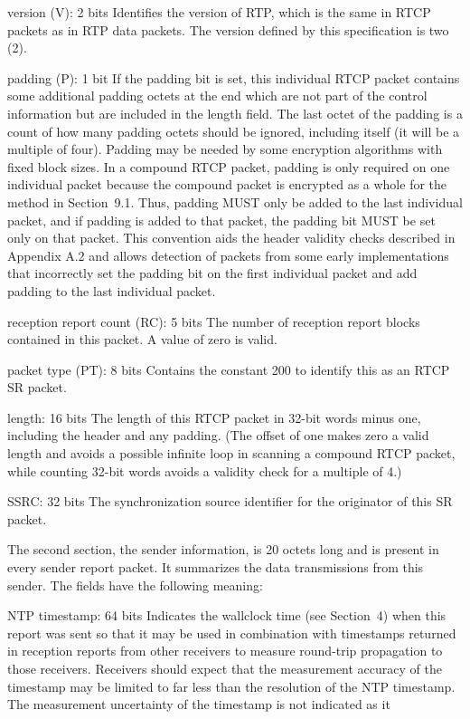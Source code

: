 \documentclass{article}
\begin{document}
version (V): 2 bits Identifies the version of RTP, which is the same in RTCP packets as in RTP data packets.  The version defined by this specification is two (2).

padding (P): 1 bit If the padding bit is set, this individual RTCP packet contains some additional padding octets at the end which are not part of the control information but are included in the length field.  The last octet of the padding is a count of how many padding octets should be ignored, including itself (it will be a multiple of four).  Padding may be needed by some encryption algorithms with fixed block sizes.  In a compound RTCP packet, padding is only required on one individual packet because the compound packet is encrypted as a whole for the method in Section~9.1.  Thus, padding MUST only be added to the last individual packet, and if padding is added to that packet, the padding bit MUST be set only on that packet.  This convention aids the header validity checks described in Appendix A.2 and allows detection of packets from some early implementations that incorrectly set the padding bit on the first individual packet and add padding to the last individual packet.

reception report count (RC): 5 bits The number of reception report blocks contained in this packet.  A value of zero is valid.

packet type (PT): 8 bits Contains the constant 200 to identify this as an RTCP SR packet.

length: 16 bits The length of this RTCP packet in 32-bit words minus one, including the header and any padding.  (The offset of one makes zero a valid length and avoids a possible infinite loop in scanning a compound RTCP packet, while counting 32-bit words avoids a validity check for a multiple of 4.)

SSRC: 32 bits The synchronization source identifier for the originator of this SR packet.

The second section, the sender information, is 20 octets long and is present in every sender report packet.  It summarizes the data transmissions from this sender.  The fields have the following meaning:

NTP timestamp: 64 bits Indicates the wallclock time (see Section~4) when this report was sent so that it may be used in combination with timestamps returned in reception reports from other receivers to measure round-trip propagation to those receivers.  Receivers should expect that the measurement accuracy of the timestamp may be limited to far less than the resolution of the NTP timestamp.  The measurement uncertainty of the timestamp is not indicated as it
\end{document}
